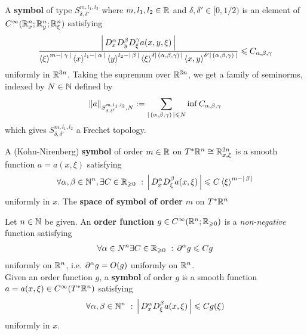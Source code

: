 \documentclass[12pt]{article}
\begin{document}
\begin{fdefinition}
A \textbf{symbol} of type $S^{m, l_1, l_2}_{\delta, \delta'}$ where $m, l_1, l_2 \in \R$ and $\delta, \delta' \in [0, 1/2)$ is an element of $C^\infty(\R^n_x; \R^n_y; \R^n_\xi)$ satisfying 
\begin{align*}
\frac{\abs{D^\alpha_xD^\beta_yD^\gamma_\xi a(x, y, \xi)}}{\sym[\xi]^{m - \abs{\gamma}} \sym[x]^{l_1 - \abs{\alpha}} \sym[y]^{l_2 - \abs{\beta}} \sym[\xi]^{\delta \abs{(\alpha, \beta, \gamma)}} \sym[x, y]^{\delta' \abs{(\alpha, \beta, \gamma)}}} \leq C_{\alpha, \beta, \gamma}
\end{align*}
uniformly in $\R^{3n}$. Taking the supremum over $\R^{3n}$, we get a family of seminorms, indexed by $N \in \N$ defined by 
\begin{align*}
\norm[a]_{S^{m, l_1, l_2}_{\delta, \delta'}, N} := \sum_{\abs{(\alpha, \beta, \gamma)} \leq N} \inf C_{\alpha, \beta, \gamma}
\end{align*}
which gives $S^{m, l_1, l_2}_{\delta, \delta'}$ a Frechet topology. 
\end{fdefinition}

\begin{fdefinition}
    A (Kohn-Nirenberg) \textbf{symbol} of order $m \in \R$ on $T^*\R^n \cong \R^{2n}_{x, \xi}$ is a smooth function $a = a(x, \xi)$ satisfying
    \begin{align*}
    \forall \alpha, \beta \in \N^n, \exists C \in \R_{\geq 0} \st \abs{D_x^\alpha D_\xi^\beta a(x, \xi)} \leq C\inprod[\xi]^{m - \abs{\beta}}
    \end{align*}
    uniformly in $x$. The \textbf{space of symbol of order} $m$ on $T^*\R^n$
\end{fdefinition}

\begin{fdefinition}
Let $n \in \N$ be given. An \textbf{order function} $g \in C^\infty(\R^n; \R_{\geq 0})$ is a \textit{non-negative} function satisfying 
\begin{align*}
\forall \alpha \in N^n \exists C \in \R_{\geq 0} \st \p^\alpha g \leq C g
\end{align*}
uniformly on $\R^n$, i.e. $\p^\alpha g = O(g)$ uniformly on $\R^n$. \\

Given an order function $g$, a \textbf{symbol} of order $g$ is a smooth function $a = a(x, \xi) \in C^\infty(T^*\R^n)$ satisfying 
\begin{align*}
\forall \alpha, \beta \in \N^n \st \abs{D^\alpha_x D^\beta_\xi a(x, \xi)} \leq C g(\xi)
\end{align*}
uniformly in $x$.
\end{fdefinition}
\end{document}
